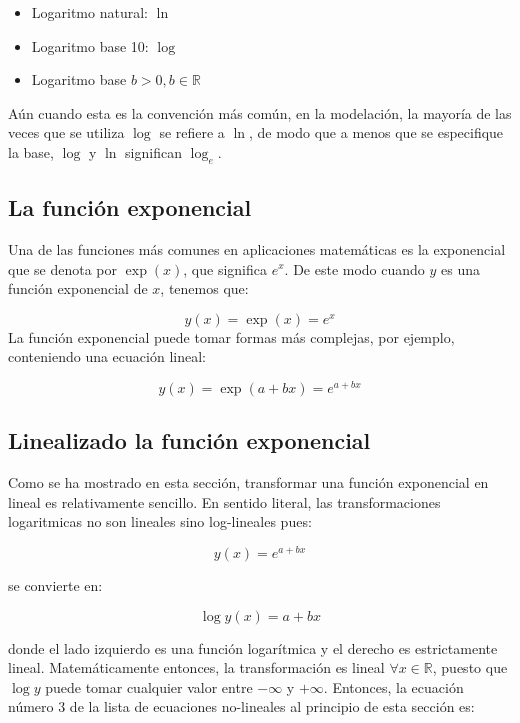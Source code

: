 \documentclass[
]{book}
\providecommand{\tightlist}{%
  \setlength{\itemsep}{0pt}\setlength{\parskip}{0pt}}
\begin{document}
\begin{itemize}
\tightlist
\item
  Logaritmo natural: \(\ln\)
\item
  Logaritmo base 10: \(\log\)
\item
  Logaritmo base \(b > 0, b \in \mathbb{R}\)
\end{itemize}

Aún cuando esta es la convención más común, en la modelación, la mayoría de las veces que se utiliza \(\log\) se refiere a \(\ln\), de modo que a menos que se especifique la base, \(\log\) y \(\ln\) significan \(\log_e\).

\hypertarget{la-funciuxf3n-exponencial}{%
\subsection{La función exponencial}\label{la-funciuxf3n-exponencial}}

Una de las funciones más comunes en aplicaciones matemáticas es la exponencial que se denota por \(\exp(x)\), que significa \(e^x\). De este modo cuando \(y\) es una función exponencial de \(x\), tenemos que:

\[y(x) = \exp(x) = e^x\]
La función exponencial puede tomar formas más complejas, por ejemplo, conteniendo una ecuación lineal:

\[y(x) = \exp(a + bx) = e^{a + bx}\]

\hypertarget{linealizado-la-funciuxf3n-exponencial}{%
\subsection{Linealizado la función exponencial}\label{linealizado-la-funciuxf3n-exponencial}}

Como se ha mostrado en esta sección, transformar una función exponencial en lineal es relativamente sencillo. En sentido literal, las transformaciones logaritmicas no son lineales sino log-lineales pues:

\begin{equation}
    y(x) = e^{a + bx} \label{eq:expon}
\end{equation}

se convierte en:

\begin{equation}
    \log y(x) = a + bx \label{eq:log-lin}
\end{equation}

donde el lado izquierdo es una función logarítmica y el derecho es estrictamente lineal. Matemáticamente entonces, la transformación es lineal \(\forall x \in \mathbb{R}\), puesto que \(\log y\) puede tomar cualquier valor entre \(-\infty\) y \(+\infty\). Entonces, la ecuación número 3 de la lista de ecuaciones no-lineales al principio de esta sección es:
\end{document}
